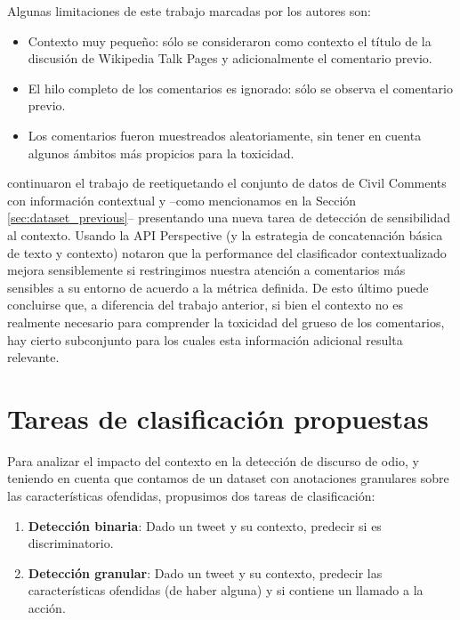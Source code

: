 Algunas limitaciones de este trabajo marcadas por los autores son:

\begin{itemize}
    \item Contexto muy pequeño: sólo se consideraron como contexto el título de la discusión de Wikipedia Talk Pages y adicionalmente el comentario previo.
    \item El hilo completo de los comentarios es ignorado: sólo se observa el comentario previo.
    \item Los comentarios fueron muestreados aleatoriamente, sin tener en cuenta algunos ámbitos más propicios para la toxicidad.
\end{itemize}

\citet{xenos-2021-context} continuaron el trabajo de \citet{pavlopoulos2020toxicity} reetiquetando el conjunto de datos de Civil Comments con información contextual y --como mencionamos en la Sección \ref{sec:dataset_previous}-- presentando una nueva tarea de detección de sensibilidad al contexto. Usando la API Perspective (y la estrategia de concatenación básica de texto y contexto) notaron que la performance del clasificador contextualizado mejora sensiblemente si restringimos nuestra atención a comentarios más sensibles a su entorno de acuerdo a la métrica definida. De esto último puede concluirse que, a diferencia del trabajo anterior, si bien  el contexto no es realmente necesario para comprender la toxicidad del grueso de los comentarios, hay cierto subconjunto para los cuales esta información adicional resulta relevante.


\section{Tareas de clasificación propuestas}
\label{sec:tasks}

Para analizar el impacto del contexto en la detección de discurso de odio, y teniendo en cuenta que contamos de un dataset con anotaciones granulares sobre las características ofendidas, propusimos dos tareas de clasificación:

\begin{enumerate}
    \item \textbf{Detección binaria}: Dado un tweet y su contexto, predecir si es discriminatorio.
    \item \textbf{Detección granular}: Dado un tweet y su contexto, predecir las características ofendidas (de haber alguna) y si contiene un llamado a la acción.
\end{enumerate}

